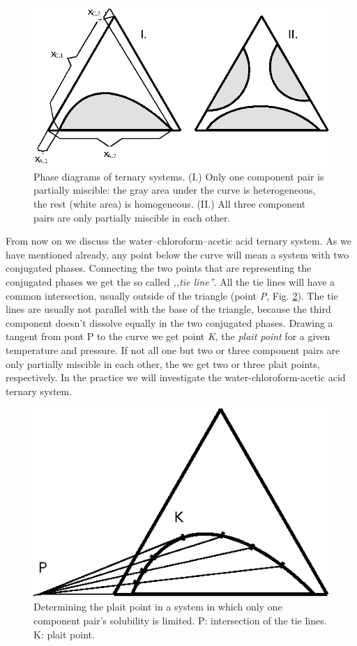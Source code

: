 \begin{figure}
\centering
\includegraphics{fig/terner2.eps}
\caption{Phase diagrams of ternary systems. (I.) Only one component pair is partially miscible: the gray area under the curve is heterogeneous, the rest (white area) is homogeneous. (II.) All three component pairs are only partially miscible in each other.}
\label{fig:2}
\end{figure}


From now on we discuss the water--chloroform--acetic acid ternary system. As we have mentioned already, any point below the curve will mean a system with two conjugated phases. Connecting the two points that are representing the conjugated phases we get the so called \emph{,,tie line''}. All the tie lines will have a common intersection, usually outside of the triangle (point \emph{P}, Fig. \ref{fig:3}). The tie lines are usually not parallel with the base of the triangle, because the third component doesn't dissolve equally in the two conjugated phases. Drawing a tangent from pont P to the curve we get point \emph{K}, the \emph{plait point} for a given temperature and pressure. If not all one but two or three component pairs are only partially miscible in each other, the we get two or three plait points, respectively. In the practice we will investigate the water-chloroform-acetic acid ternary system. 

\begin{figure}
\centering
\includegraphics{fig/terner3.eps}
\caption{Determining the plait point in a system in which only one component pair's solubility is limited. P: intersection of the tie lines. K: plait point.}
\label{fig:3}
\end{figure}


